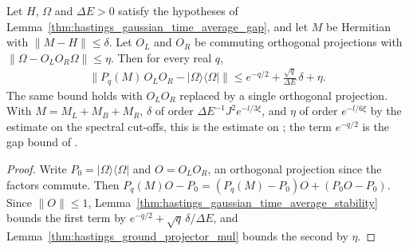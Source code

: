 \begin{lemma}
    \label{thm:hastings_moved_estimate}
    \leanok
    Let $H$, $\Omega$ and $\Delta E>0$ satisfy the hypotheses of
    Lemma~\ref{thm:hastings_gaussian_time_average_gap}, and let $M$ be
    Hermitian with $\|M-H\|\le\delta$. Let $O_L$ and $O_R$ be commuting
    orthogonal projections with $\|\Omega-O_LO_R\Omega\|\le\eta$. Then for
    every real $q$,
    \begin{align*}
        \bigl\|P_q(M)\,O_LO_R-|\Omega\rangle\langle\Omega|\bigr\|
        \le e^{-q/2}+\frac{\sqrt q}{\Delta E}\,\delta+\eta.
    \end{align*}
    The same bound holds with $O_LO_R$ replaced by a single orthogonal
    projection. With $M=M_L+M_B+M_R$, $\delta$ of order
    $\Delta E^{-1}J^2e^{-l/3\xi}$, and $\eta$ of order $e^{-l/6\xi}$ by the
    estimate on the spectral cut-offs, this is the estimate on
    \cite[lines 865--876]{Hastings2007AreaLaw}; the term $e^{-q/2}$ is the gap
    bound of \cite[line 848]{Hastings2007AreaLaw}.
\end{lemma}
\begin{proof}\leanok
    Write $P_0=|\Omega\rangle\langle\Omega|$ and $O=O_LO_R$, an orthogonal
    projection since the factors commute. Then
    $P_q(M)O-P_0=(P_q(M)-P_0)O+(P_0O-P_0)$. Since $\|O\|\le1$,
    Lemma~\ref{thm:hastings_gaussian_time_average_stability} bounds the
    first term by $e^{-q/2}+\sqrt q\,\delta/\Delta E$, and
    Lemma~\ref{thm:hastings_ground_projector_mul} bounds the second by
    $\eta$.
\end{proof}
